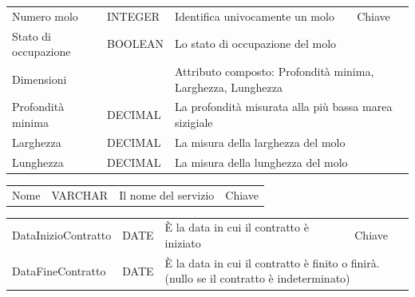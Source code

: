 \begin{center}
    \begin{tabularx}{\textwidth}{|l|l|l|X|}
        \hline
        \rowcolor{gray!30}
        \multicolumn{4}{|c|}{\textbf{Molo}}\\

        \hline
        Numero molo & INTEGER & Identifica univocamente un molo & Chiave\\
        \hline
        Stato di occupazione & BOOLEAN &\multicolumn{2}{l|}{ Lo stato di occupazione del molo}\\
        \hline
        Dimensioni &  & \multicolumn{2}{l|}{Attributo composto: Profondità minima, Larghezza, Lunghezza} \\
        \hline
        Profondità minima & DECIMAL & \multicolumn{2}{l|}{La profondità misurata alla più bassa marea sizigiale} \\
        \hline
        Larghezza & DECIMAL & \multicolumn{2}{l|}{La misura della larghezza del molo} \\
        \hline
        Lunghezza & DECIMAL & \multicolumn{2}{l|}{La misura della lunghezza del molo} \\
        \hline
    \end{tabularx}
\end{center}

\begin{center}
    \begin{tabularx}{\textwidth}{|l|l|l|X|}
        \hline
        \rowcolor{gray!30}
        \multicolumn{4}{|c|}{\textbf{Servizio}}\\
        \hline
        Nome & VARCHAR & Il nome del servizio & Chiave \\
        \hline
    \end{tabularx}
\end{center}


\begin{center}
    \begin{tabularx}{\textwidth}{|l|l|l|X|}
        \hline
        \rowcolor{gray!30}
        \multicolumn{4}{|c|}{\textbf{Addetto}}\\
        \hline
        DataInizioContratto & DATE & È la data in cui il contratto è iniziato & Chiave\\
        \hline
        DataFineContratto & DATE &\multicolumn{2}{l|}{ È la data in cui il contratto è finito o finirà.(nullo se il contratto è indeterminato)}\\
        \hline
    \end{tabularx}
\end{center}

